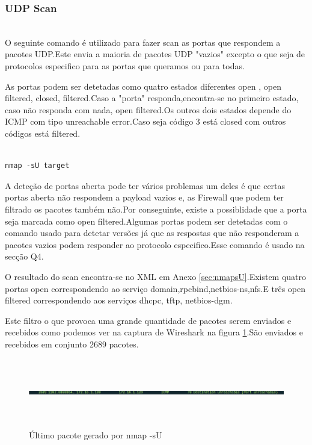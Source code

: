 \subsubsection{UDP Scan}
\hfill\\

O seguinte comando é utilizado para fazer scan as portas que respondem a pacotes UDP.Este envia a maioria de pacotes UDP "vazios" excepto o que seja de protocolos especifico para as portas que queramos ou para todas.

As portas podem ser detetadas como quatro estados diferentes open , open filtered, closed, filtered.Caso a "porta" responda,encontra-se no primeiro estado, caso não responda com nada, open filtered.Os outros dois estados depende do ICMP com tipo unreachable error.Caso seja código 3 está closed com outros códigos está filtered.

\begin{lstlisting}

nmap -sU target

\end{lstlisting}

A deteção de portas aberta pode ter vários problemas um deles é que certas portas aberta não respondem a payload vazios e, as Firewall que podem ter filtrado os pacotes também não.Por conseguinte, existe a possiblidade que a porta seja marcada como open filtered.Algumas portas podem ser detetadas com o comando usado para detetar versões já que as respostas que não responderam a pacotes vazios podem responder ao protocolo especifico.Esse comando é usado na secção Q4.

O resultado do scan encontra-se no XML em Anexo \ref{sec:nmapsU}.Existem quatro portas open correspondendo ao serviço domain,rpcbind,netbios-ns,nfs.E três open filtered correspondendo aos serviços dhcpc, tftp, netbios-dgm.

Este filtro o que provoca uma grande quantidade de pacotes serem enviados e recebidos como podemos ver na captura de Wireshark na figura \ref{fig:nmapsULast}.São enviados e recebidos em conjunto 2689 pacotes.

\begin{figure}[h!]
	\centering
		
	\includegraphics[width=\textwidth,height=3cm,keepaspectratio]{images/nmapLast.png}
		
	\caption{Último pacote gerado por nmap -sU}
		
	\label{fig:nmapsULast}
\end{figure}

